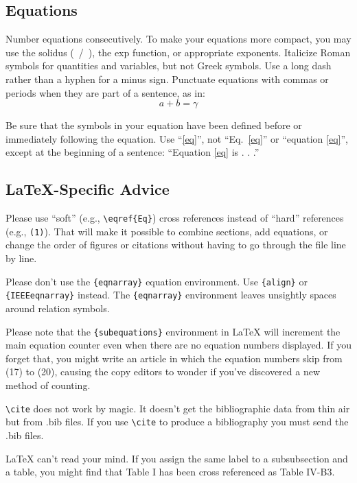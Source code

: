 \documentclass[conference]{IEEEtran}
\begin{document}
\subsection{Equations}
Number equations consecutively. To make your 
equations more compact, you may use the solidus (~/~), the exp function, or 
appropriate exponents. Italicize Roman symbols for quantities and variables, 
but not Greek symbols. Use a long dash rather than a hyphen for a minus 
sign. Punctuate equations with commas or periods when they are part of a 
sentence, as in:
\begin{equation}
a+b=\gamma\label{eq}
\end{equation}

Be sure that the 
symbols in your equation have been defined before or immediately following 
the equation. Use ``\eqref{eq}'', not ``Eq.~\eqref{eq}'' or ``equation \eqref{eq}'', except at 
the beginning of a sentence: ``Equation \eqref{eq} is . . .''

\subsection{\LaTeX-Specific Advice}

Please use ``soft'' (e.g., \verb|\eqref{Eq}|) cross references instead
of ``hard'' references (e.g., \verb|(1)|). That will make it possible
to combine sections, add equations, or change the order of figures or
citations without having to go through the file line by line.

Please don't use the \verb|{eqnarray}| equation environment. Use
\verb|{align}| or \verb|{IEEEeqnarray}| instead. The \verb|{eqnarray}|
environment leaves unsightly spaces around relation symbols.

Please note that the \verb|{subequations}| environment in {\LaTeX}
will increment the main equation counter even when there are no
equation numbers displayed. If you forget that, you might write an
article in which the equation numbers skip from (17) to (20), causing
the copy editors to wonder if you've discovered a new method of
counting.

\verb|\cite| does not work by magic. It doesn't get the bibliographic
data from thin air but from .bib files. If you use \verb|\cite| to produce a
bibliography you must send the .bib files. 

{\LaTeX} can't read your mind. If you assign the same label to a
subsubsection and a table, you might find that Table I has been cross
referenced as Table IV-B3. 
\end{document}
